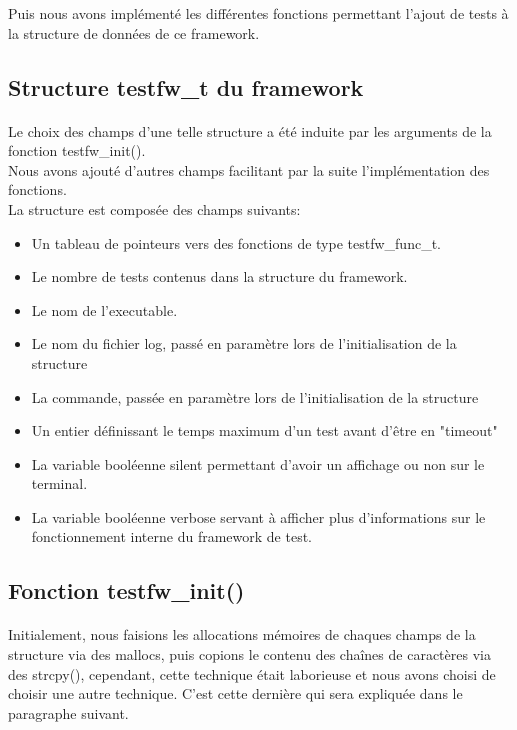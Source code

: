 \documentclass[12pt]{article}
\begin{document}
Puis nous avons implémenté les différentes fonctions permettant l'ajout de tests à la structure de données de ce framework. \\

\subsection{Structure testfw\_t du framework}

\paragraph{}
Le choix des champs d'une telle structure a été induite par les arguments de la fonction testfw\_init(). \\

Nous avons ajouté d'autres champs facilitant par la suite l'implémentation des fonctions.\\

La structure est composée des champs suivants:
 \begin{itemize}
 \item Un tableau de pointeurs vers des fonctions de type testfw\_func\_t.
 \item Le nombre de tests contenus dans la structure du framework.
 \item Le nom de l'executable.
 \item Le nom du fichier log, passé en paramètre lors de l'initialisation de la structure
 \item La commande, passée en paramètre lors de l'initialisation de la structure
 \item Un entier définissant le temps maximum d'un test avant d'être en "timeout"
 \item La variable booléenne silent permettant d'avoir un affichage ou non sur le terminal.
 \item La variable booléenne verbose servant à afficher plus d'informations sur le fonctionnement interne du framework de test.
\end{itemize}

\newpage
\subsection{Fonction testfw\_init()}

\paragraph{}
Initialement, nous faisions les allocations mémoires de chaques champs de la structure via des mallocs, puis copions le contenu des chaînes de caractères via des strcpy(), cependant, cette technique était laborieuse et nous avons choisi de choisir une autre technique. C'est cette dernière qui sera expliquée dans le paragraphe suivant. \\
\end{document}
